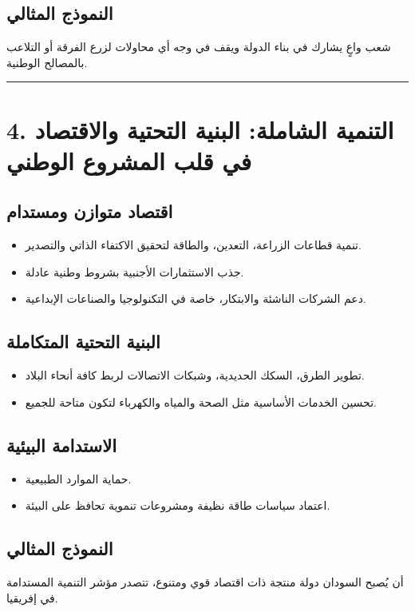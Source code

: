 \documentclass[12pt]{article}
\begin{document}
\subsection{النموذج المثالي}
شعب واعٍ يشارك في بناء الدولة ويقف في وجه أي محاولات لزرع الفرقة أو التلاعب بالمصالح الوطنية.

\hrule

\section{4. التنمية الشاملة: البنية التحتية والاقتصاد في قلب المشروع الوطني}
\subsection{اقتصاد متوازن ومستدام}
\begin{itemize}
    \item تنمية قطاعات الزراعة، التعدين، والطاقة لتحقيق الاكتفاء الذاتي والتصدير.
    \item جذب الاستثمارات الأجنبية بشروط وطنية عادلة.
    \item دعم الشركات الناشئة والابتكار، خاصة في التكنولوجيا والصناعات الإبداعية.
\end{itemize}

\subsection{البنية التحتية المتكاملة}
\begin{itemize}
    \item تطوير الطرق، السكك الحديدية، وشبكات الاتصالات لربط كافة أنحاء البلاد.
    \item تحسين الخدمات الأساسية مثل الصحة والمياه والكهرباء لتكون متاحة للجميع.
\end{itemize}

\subsection{الاستدامة البيئية}
\begin{itemize}
    \item حماية الموارد الطبيعية.
    \item اعتماد سياسات طاقة نظيفة ومشروعات تنموية تحافظ على البيئة.
\end{itemize}

\subsection{النموذج المثالي}
أن يُصبح السودان دولة منتجة ذات اقتصاد قوي ومتنوع، تتصدر مؤشر التنمية المستدامة في إفريقيا.
\end{document}
